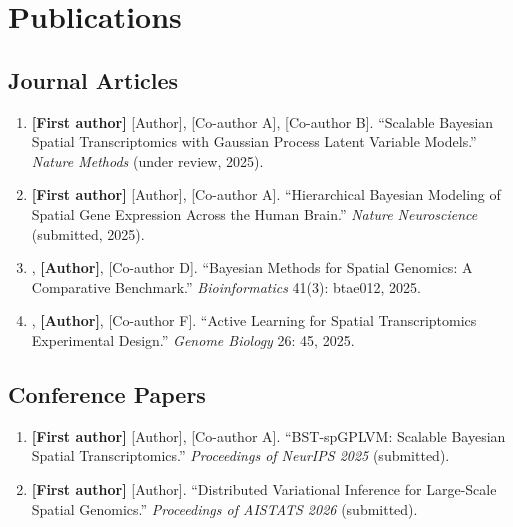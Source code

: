 \documentclass[
    language=english,
    doctype=postdoc-report,
    institution=none,
]{../../omnilatex}
\begin{document}
\section{Publications}
\label{sec:publications}

\subsection{Journal Articles}

\begin{enumerate}
    \item \textbf{[First author]} [Author], [Co-author A], [Co-author B].
          ``Scalable Bayesian Spatial Transcriptomics with Gaussian Process
          Latent Variable Models.'' \textit{Nature Methods} (under review,
          2025).

    \item \textbf{[First author]} [Author], [Co-author A]. ``Hierarchical
          Bayesian Modeling of Spatial Gene Expression Across the Human
          Brain.'' \textit{Nature Neuroscience} (submitted, 2025).

    \item [Co-author C], \textbf{[Author]}, [Co-author D]. ``Bayesian
          Methods for Spatial Genomics: A Comparative Benchmark.''
          \textit{Bioinformatics} 41(3): btae012, 2025.

    \item [Co-author E], \textbf{[Author]}, [Co-author F]. ``Active
          Learning for Spatial Transcriptomics Experimental Design.''
          \textit{Genome Biology} 26: 45, 2025.
\end{enumerate}

\subsection{Conference Papers}

\begin{enumerate}
    \item \textbf{[First author]} [Author], [Co-author A]. ``BST-spGPLVM:
          Scalable Bayesian Spatial Transcriptomics.'' \textit{Proceedings
          of NeurIPS 2025} (submitted).

    \item \textbf{[First author]} [Author]. ``Distributed Variational
          Inference for Large-Scale Spatial Genomics.'' \textit{Proceedings
          of AISTATS 2026} (submitted).
\end{enumerate}
\end{document}
